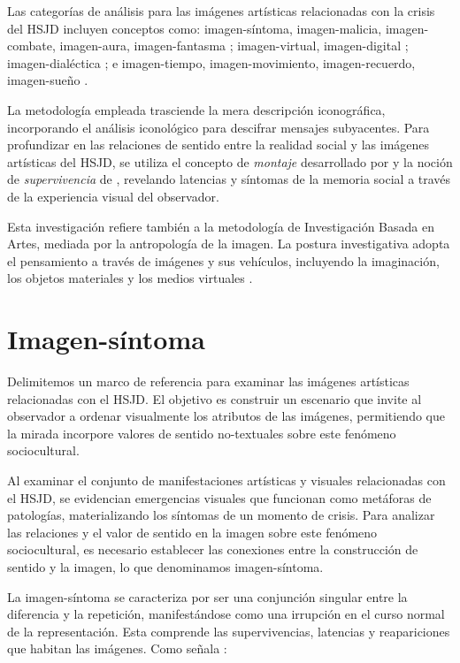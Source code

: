 Las categorías de análisis para las imágenes artísticas relacionadas con la crisis del HSJD incluyen conceptos como: imagen-síntoma, imagen-malicia, imagen-combate, imagen-aura, imagen-fantasma \parencite{DidiHuberman2011}; imagen-virtual, imagen-digital \parencite{Manovich2005}; imagen-dialéctica \parencite{Benjamin2004}; e imagen-tiempo, imagen-movimiento, imagen-recuerdo, imagen-sueño \parencite{Deleuze1985}.

La metodología empleada trasciende la mera descripción iconográfica, incorporando el análisis iconológico para descifrar mensajes subyacentes. Para profundizar en las relaciones de sentido entre la realidad social y las imágenes artísticas del HSJD, se utiliza el concepto de \textit{montaje} desarrollado por \parencite{Benjamin2004} y la noción de \textit{supervivencia} de \parencite{Warburg2010}, revelando latencias y síntomas de la memoria social a través de la experiencia visual del observador.

Esta investigación refiere también a la metodología de Investigación Basada en Artes, mediada por la antropología de la imagen. La postura investigativa adopta el pensamiento a través de imágenes y sus vehículos, incluyendo la imaginación, los objetos materiales y los medios virtuales \parencite{Leavy2018}.

\section{Imagen-síntoma}

Delimitemos un marco de referencia para examinar las imágenes artísticas relacionadas con el HSJD. El objetivo es construir un escenario que invite al observador a ordenar visualmente los atributos de las imágenes, permitiendo que la mirada incorpore valores de sentido no-textuales sobre este fenómeno sociocultural.

Al examinar el conjunto de manifestaciones artísticas y visuales relacionadas con el HSJD, se evidencian emergencias visuales que funcionan como metáforas de patologías, materializando los síntomas de un momento de crisis. Para analizar las relaciones y el valor de sentido en la imagen sobre este fenómeno sociocultural, es necesario establecer las conexiones entre la construcción de sentido y la imagen, lo que denominamos imagen-síntoma.

La imagen-síntoma se caracteriza por ser una conjunción singular entre la diferencia y la repetición, manifestándose como una irrupción en el curso normal de la representación. Esta comprende las supervivencias, latencias y reapariciones que habitan las imágenes. Como señala \parencite[p.~304]{DidiHuberman2011}:

